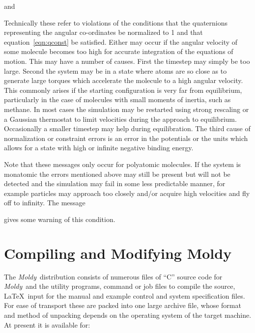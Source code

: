 \documentclass[a4paper,twoside]{report}
\newcommand{\moldy}{\emph{Moldy}}
\begin{document}

and


\noindent
Technically these refer to violations of the conditions that the
quaternions representing the angular co-ordinates be normalized to 1
and that equation~\ref{eqn:qconst} be satisfied.  Either may occur if
the angular velocity of some molecule becomes too high for accurate
integration of the equations of motion. This may have a number of
causes.  First the timestep may simply be too large.  Second the
system may be in a state where atoms are so close as to generate large
torques which accelerate the molecule to a high angular velocity. This
commonly arises if the starting configuration is very far from
equilibrium, particularly in the case of molecules with small moments
of inertia, such as methane.  In most cases the simulation may be
restarted using strong rescaling or a Gaussian thermostat to limit
velocities during the approach to equilibrium.  Occasionally a smaller
timestep may help during equilibration.  The third cause of
normalization or constraint errors is an error in the potentials or
the units which allows for a state with high or infinite negative
binding energy.

Note that these messages only occur for polyatomic molecules.  If the
system is monatomic the errors mentioned above may still be present
but will not be detected and the simulation may fail in some less
predictable manner, for example particles may approach too closely
and/or acquire high velocities and fly off to infinity.  The message


\noindent
gives some warning of this condition.

\chapter{Compiling and Modifying Moldy} %

The \moldy\  distribution consists of numerous files of ``C'' source code
for \moldy\  and the utility programs, command or job files to compile
the source, \LaTeX\ input for the manual and example control and system
specification files.  For ease of transport these are packed into one
large archive file, whose format and method of unpacking depends
on the operating system of the target machine.  At present it is
available for:
\end{document}

